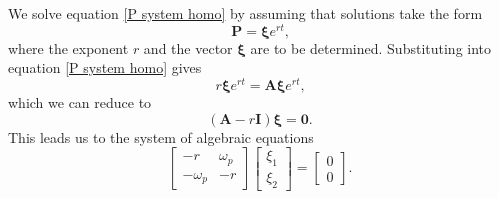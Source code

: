 \documentclass{article}
\begin{document}
We solve equation \ref{P system homo} by assuming that solutions take the form 
\begin{equation}
    \mathbf{P} = \pmb{\xi}e^{rt}\text{,}
\end{equation}
where the exponent $r$ and the vector $\pmb{\xi}$ are to be determined. Substituting into equation \ref{P system homo} gives
$$r\pmb{\xi}e^{rt} = \mathbf{A}\pmb{\xi}e^{rt}\text{,}$$ which we can reduce to
\begin{equation}
    (\mathbf{A} - r\mathbf{I})\pmb{\xi} = \mathbf{0}\text{.}
\end{equation}
This leads us to the system of algebraic equations
\begin{equation}\label{system}
    \begin{bmatrix}
        -r & \omega_p \\
        -\omega_p & -r
    \end{bmatrix}
    \begin{bmatrix}
        \xi_1 \\ \xi_2
    \end{bmatrix} =
    \begin{bmatrix}
        0 \\ 0
    \end{bmatrix}\text{.}
\end{equation}
\end{document}
